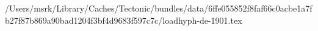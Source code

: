 /Users/msrk/Library/Caches/Tectonic/bundles/data/6ffe055852f8faf66c0acbe1a7fb27f87b869a90bad1204f3bf4d9683f597c7c/loadhyph-de-1901.tex